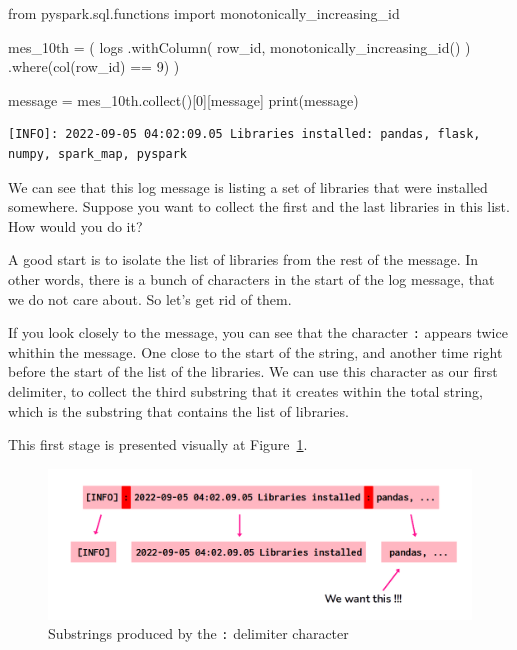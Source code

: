 \documentclass[
  11pt,
  letterpaper,
  DIV=11,
  numbers=noendperiod]{scrreprt}
\newenvironment{Shaded}{\begin{snugshade}}{\end{snugshade}}
\newcommand{\BuiltInTok}[1]{\textcolor[rgb]{0.00,0.23,0.31}{#1}}
\newcommand{\DecValTok}[1]{\textcolor[rgb]{0.68,0.00,0.00}{#1}}
\newcommand{\ImportTok}[1]{\textcolor[rgb]{0.00,0.46,0.62}{#1}}
\newcommand{\NormalTok}[1]{\textcolor[rgb]{0.00,0.23,0.31}{#1}}
\newcommand{\OperatorTok}[1]{\textcolor[rgb]{0.37,0.37,0.37}{#1}}
\newcommand{\StringTok}[1]{\textcolor[rgb]{0.13,0.47,0.30}{#1}}
\begin{document}
\begin{Shaded}
\begin{Highlighting}[]
\ImportTok{from}\NormalTok{ pyspark.sql.functions }\ImportTok{import}\NormalTok{ monotonically\_increasing\_id}

\NormalTok{mes\_10th }\OperatorTok{=}\NormalTok{ (}
\NormalTok{    logs}
\NormalTok{    .withColumn(}
        \StringTok{\textquotesingle{}row\_id\textquotesingle{}}\NormalTok{,}
\NormalTok{        monotonically\_increasing\_id()}
\NormalTok{    )}
\NormalTok{    .where(col(}\StringTok{\textquotesingle{}row\_id\textquotesingle{}}\NormalTok{) }\OperatorTok{==} \DecValTok{9}\NormalTok{)}
\NormalTok{)}

\NormalTok{message }\OperatorTok{=}\NormalTok{ mes\_10th.collect()[}\DecValTok{0}\NormalTok{][}\StringTok{\textquotesingle{}message\textquotesingle{}}\NormalTok{]}
\BuiltInTok{print}\NormalTok{(message)}
\end{Highlighting}
\end{Shaded}

\begin{verbatim}
[INFO]: 2022-09-05 04:02:09.05 Libraries installed: pandas, flask, numpy, spark_map, pyspark
\end{verbatim}

We can see that this log message is listing a set of libraries that were
installed somewhere. Suppose you want to collect the first and the last
libraries in this list. How would you do it?

A good start is to isolate the list of libraries from the rest of the
message. In other words, there is a bunch of characters in the start of
the log message, that we do not care about. So let's get rid of them.

If you look closely to the message, you can see that the character
\texttt{:} appears twice whithin the message. One close to the start of
the string, and another time right before the start of the list of the
libraries. We can use this character as our first delimiter, to collect
the third substring that it creates within the total string, which is
the substring that contains the list of libraries.

This first stage is presented visually at
Figure~\ref{fig-substring-delimiter1}.

\begin{figure}

{\centering \includegraphics{Chapters/./../Figures/substring-delimiter1.png}

}

\caption{\label{fig-substring-delimiter1}Substrings produced by the
\texttt{:} delimiter character}

\end{figure}
\end{document}
